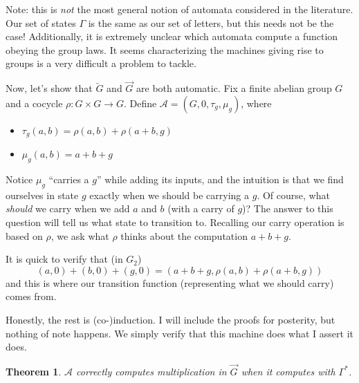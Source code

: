 \documentclass[12pt]{article}
\newtheorem{thm}{Theorem}
\theoremstyle{definition}
\begin{document}
  Note: this is \emph{not} the most general notion of automata considered
  in the literature. Our set of states $\Gamma$ is the same as our set of
  letters, but this needs not be the case! Additionally, 
  it is extremely unclear which automata compute a function obeying the 
  group laws. It seems characterizing the machines giving rise to groups is
  a very difficult a problem to tackle.

  \bigskip

  Now, let's show that $\overleftarrow{G}$ and $\overrightarrow{G}$ are both
  automatic. Fix a finite abelian group $G$ and a cocycle $\rho : G \times G \to G$.
  Define $\mathcal{A} = (G, 0, \tau_g, \mu_g)$, where

  \begin{itemize}
    \item $\tau_g(a,b) = \rho(a,b) + \rho(a+b,g)$ 
    \item $\mu_g(a,b) = a + b + g$
  \end{itemize}

  Notice $\mu_g$ ``carries a $g$'' while adding its inputs, 
  and the intuition is that we find ourselves in state $g$ 
  exactly when we should be carrying a $g$. 
  Of course, what \emph{should} we carry when we add $a$ and $b$
  (with a carry of $g$)? The answer to this question will tell us
  what state to transition to. Recalling our carry operation is based
  on $\rho$, we ask what $\rho$ thinks about the computation $a+b+g$.

  It is quick to verify that (in $G_2$)
  \[ (a,0) + (b,0) + (g,0) = (a+b+g, \rho(a,b) + \rho(a+b,g)) \]
  and this is where our transition function 
  (representing what we should carry) comes from.

  \bigskip

  Honestly, the rest is (co-)induction. I will include the proofs for 
  posterity, but nothing of note happens. We simply verify that this machine
  does what I assert it does.

  \begin{thm}
    $\mathcal{A}$ correctly computes multiplication in $\overrightarrow{G}$
    when it computes with $\Gamma^*$.
  \end{thm}
\end{document}
